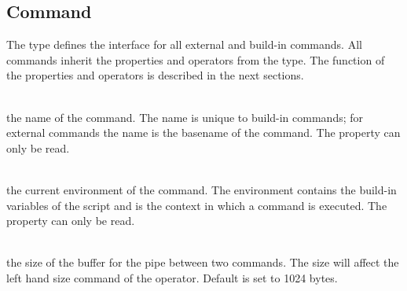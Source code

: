 \subsection{Command} 

%

The  type defines the interface for all external and
build-in commands. All commands inherit the properties and operators
from the  type.
The function of the properties and operators is described
in the next sections.

\begin{asparadesc}
%
\item[\code{theName}] \hfill \\
the name of the command. The name is unique to build-in commands; for external
commands the name is the basename\cite{basename13} of the command.
The property can only be read.
%
\item[\code{theEnvironment}] \hfill \\
the current environment of the command. The environment contains the
build-in variables of the script and is the context in which a command is executed.
The property can only be read.
%
\item[\code{pipeBufferSize}] \hfill \\
the size of the buffer for the pipe between two commands. The size will affect
the left hand size command of the  operator.
Default is set to
1024 bytes.
%
\end{asparadesc}


